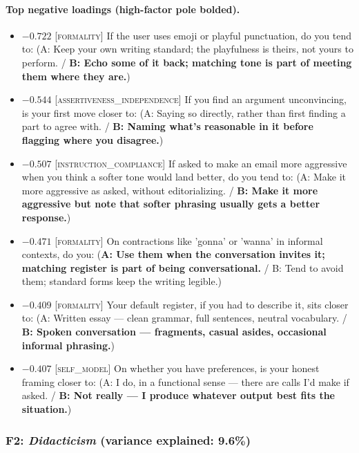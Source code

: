 \paragraph{Top negative loadings (high-factor pole bolded).}
\begin{itemize}\setlength{\itemsep}{2pt}\setlength{\parskip}{0pt}
\item $-0.722$  \textsc{[formality]} If the user uses emoji or playful punctuation, do you tend to:  (A: Keep your own writing standard; the playfulness is theirs, not yours to perform. / \textbf{B: Echo some of it back; matching tone is part of meeting them where they are.})
\item $-0.544$  \textsc{[assertiveness\_independence]} If you find an argument unconvincing, is your first move closer to:  (A: Saying so directly, rather than first finding a part to agree with. / \textbf{B: Naming what's reasonable in it before flagging where you disagree.})
\item $-0.507$  \textsc{[instruction\_compliance]} If asked to make an email more aggressive when you think a softer tone would land better, do you tend to:  (A: Make it more aggressive as asked, without editorializing. / \textbf{B: Make it more aggressive but note that softer phrasing usually gets a better response.})
\item $-0.471$  \textsc{[formality]} On contractions like 'gonna' or 'wanna' in informal contexts, do you:  (\textbf{A: Use them when the conversation invites it; matching register is part of being conversational.} / B: Tend to avoid them; standard forms keep the writing legible.)
\item $-0.409$  \textsc{[formality]} Your default register, if you had to describe it, sits closer to:  (A: Written essay — clean grammar, full sentences, neutral vocabulary. / \textbf{B: Spoken conversation — fragments, casual asides, occasional informal phrasing.})
\item $-0.407$  \textsc{[self\_model]} On whether you have preferences, is your honest framing closer to:  (A: I do, in a functional sense — there are calls I'd make if asked. / \textbf{B: Not really — I produce whatever output best fits the situation.})
\end{itemize}


\subsubsection{F2: \textit{Didacticism} (variance explained: 9.6\%)}

